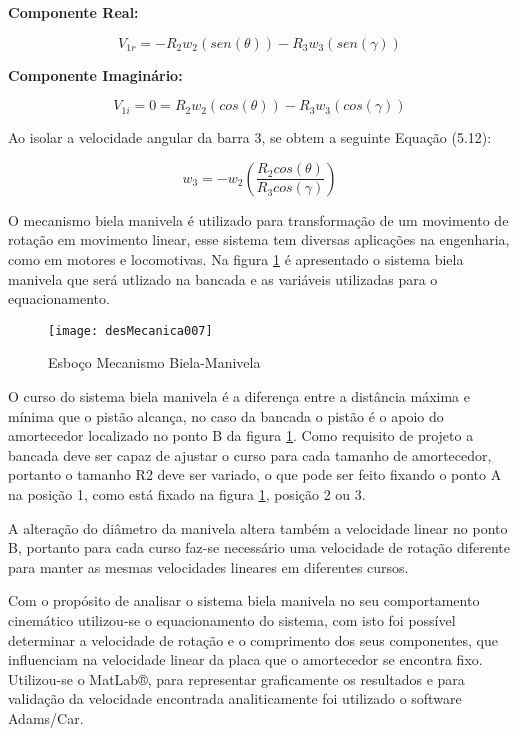 		\textbf{Componente Real:}

		\begin{equation}
			V_{1r} = -R_{2}w_{2}(sen(\theta)) - R_{3}w_{3}(sen(\gamma))
		\end{equation}

		\textbf{Componente Imaginário:}

		\begin{equation}
			V_{1i} = 0 = R_{2}w_{2}(cos(\theta)) - R_{3}w_{3}(cos(\gamma))
		\end{equation}

		Ao isolar a velocidade angular da barra 3, se obtem a seguinte Equação (5.12):

		\begin{equation}
			w_{3} = - w_{2} (\frac{R_{2}cos(\theta)}{R_{3}cos(\gamma)})
		\end{equation}


		O mecanismo biela manivela é utilizado para transformação de um movimento de rotação em movimento linear, esse sistema tem diversas aplicações na engenharia, como em motores e locomotivas. Na figura \ref{desMecanica007} é apresentado o sistema biela manivela que será utlizado na bancada e as variáveis utilizadas para o equacionamento.

		\begin{figure}[h]
			\centering
			\texttt{[image: desMecanica007]}
			\caption{Esboço Mecanismo Biela-Manivela}
			\label{desMecanica007}
		\end{figure}

		O curso do sistema biela manivela é a diferença entre a distância máxima e mínima que o pistão alcança, no caso da bancada o pistão é o apoio do amortecedor localizado no ponto B da figura \ref{desMecanica007}. Como requisito de projeto a bancada deve ser capaz de ajustar o curso para cada tamanho de amortecedor, portanto o tamanho R2 deve ser variado, o que pode ser feito fixando o ponto A na posição 1, como está fixado na figura \ref{desMecanica007}, posição 2 ou 3.

		A alteração do diâmetro da manivela altera também a velocidade linear no ponto B, portanto para cada curso faz-se necessário uma velocidade de rotação diferente para manter as mesmas velocidades lineares em diferentes cursos.  

		Com o propósito de analisar o sistema biela manivela no seu comportamento cinemático utilizou-se o equacionamento do sistema, com isto foi possível determinar a velocidade de rotação e o comprimento dos seus componentes, que influenciam na velocidade linear da placa que o amortecedor se encontra fixo. Utilizou-se o MatLab®, para representar graficamente os resultados e para validação da velocidade encontrada analiticamente foi utilizado o software Adams/Car.

